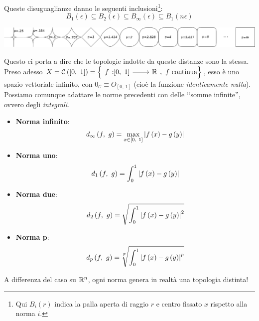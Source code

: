 Queste disuguaglianze danno le seguenti inclusioni\footnote{Qui $B_i\left(r\right)$ indica la palla aperta di raggio $r$ e centro fissato $x$ rispetto alla norma $i$.}:
\begin{equation}
B_1\left(\epsilon\right)\subseteq B_2\left(\epsilon\right)\subseteq B_\infty\left(\epsilon\right)\subseteq B_1\left(n\epsilon\right)
\end{equation}
\begin{center}
	\hspace*{-12cm}\begin{minipage}{.2\linewidth}
		\includegraphics[trim=18.1cm 0cm 0cm 0cm,clip,scale=0.37]{images/pnorm.png}
	\end{minipage}
\end{center}
Questo ci porta a dire che le topologie indotte da queste distanze sono la stessa.\\
Preso adesso $X=\mathcal{C}\left([0,\ 1]\right)=\left\{\funz{f}{[0,\ 1]}{\realset},\ f\text{ continua}\right\}$, esso è uno spazio vettoriale infinito, con $0_\mathcal{C}\equiv O_{[0,\ 1]}$ (cioè la funzione \textit{identicamente nulla}). Possiamo comunque adattare le norme precedenti con delle ‘‘somme infinite'', ovvero degli \textit{integrali}.
\vspace{-2mm}
\begin{multicols}{2}
	\begin{itemize}
		\item \textbf{Norma infinito}:
		\[\displaystyle\mvf{d_\infty}{f}{g}=\max_{x\in[0,\ 1]}{\left|f\left(x\right)-g\left(y\right)\right|}\]
		\item \textbf{Norma uno}: \[\displaystyle d_1\left(f,\ g\right)=\int_{0}^{1}\left|f\left(x\right)-g\left(y\right)\right|\]
	\end{itemize}
	\begin{itemize}
		\item \textbf{Norma due}: \[\displaystyle d_2\left(f,\ g\right)=\sqrt{\int_{0}^{1}\left|f\left(x\right)-g\left(y\right)\right|^2}\]
		\item \textbf{Norma p}: \[\displaystyle\mvf{d_p}{f}{g}=\sqrt[\leftroot{1}\uproot{3}p]{\int_{0}^{1}\left|f\left(x\right)-g\left(y\right)\right|^p}\]
	\end{itemize}
\end{multicols}
\vspace{-1mm}
\noindent A differenza del caso su $\mathbb{R}^n$, ogni norma genera in realtà una topologia distinta!
\vspace{-3mm}
